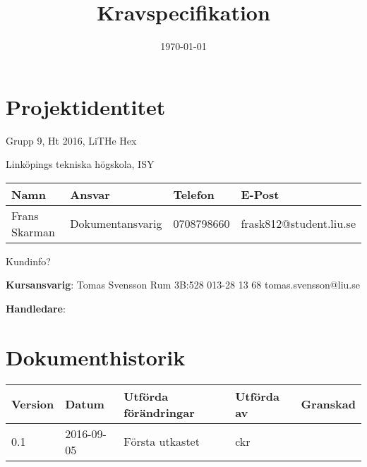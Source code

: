 \documentclass[a4paper,titlepage,12pt]{article}
\title{\textbf{Kravspecifikation}}
\date{\today}
\begin{document}
	\maketitle
	\newpage

	
	\centering
	\section{Projektidentitet}
	Grupp 9, Ht 2016, LiTHe Hex

	Linköpings tekniska högskola, ISY

    \begin{table}[h]
        \begin{tabular}[pos]{| l | l | l | l |}
			\hline
			\textbf{Namn} & \textbf{Ansvar} & \textbf{Telefon} & \textbf{E-Post} \\ \hline
			Frans Skarman & Dokumentansvarig & 0708798660 & frask812@student.liu.se \\ \hline
        \end{tabular}
    \end{table}


	Kundinfo?

	\textbf{Kursansvarig}: Tomas Svensson Rum 3B:528 013-28 13 68 tomas.svensson@liu.se

	\textbf{Handledare}:


	
	\newpage



	\section{Dokumenthistorik}
    \begin{table}[h]
        \begin{tabular}[pos]{| l | l | l | l | l |}
			\hline
			\textbf{Version} & \textbf{Datum} & \textbf{Utförda förändringar} 
			& \textbf{Utförda av} & \textbf{Granskad} \\ \hline

			0.1 & 2016-09-05 & Första utkastet & ckr & \\ \hline

        \end{tabular}
    \end{table}
\end{document}
